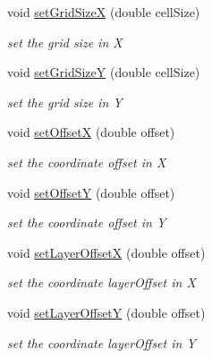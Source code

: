 \begin{DoxyCompactItemize}
void \hyperlink{class_d_d4hep_1_1_d_d_segmentation_1_1_tiled_layer_grid_x_y_a183f76f3765e6ab4985b0d6eb024785a}{setGridSizeX} (double cellSize)
\begin{DoxyCompactList}\small\item\em set the grid size in X \item\end{DoxyCompactList}\item 
void \hyperlink{class_d_d4hep_1_1_d_d_segmentation_1_1_tiled_layer_grid_x_y_a2556a5e0000580a8ffdf93bde33c36b8}{setGridSizeY} (double cellSize)
\begin{DoxyCompactList}\small\item\em set the grid size in Y \item\end{DoxyCompactList}\item 
void \hyperlink{class_d_d4hep_1_1_d_d_segmentation_1_1_tiled_layer_grid_x_y_a19c0059402e512da58c2d241d8e67de7}{setOffsetX} (double offset)
\begin{DoxyCompactList}\small\item\em set the coordinate offset in X \item\end{DoxyCompactList}\item 
void \hyperlink{class_d_d4hep_1_1_d_d_segmentation_1_1_tiled_layer_grid_x_y_a588e04b48f59f73af89b54302e3eb025}{setOffsetY} (double offset)
\begin{DoxyCompactList}\small\item\em set the coordinate offset in Y \item\end{DoxyCompactList}\item 
void \hyperlink{class_d_d4hep_1_1_d_d_segmentation_1_1_tiled_layer_grid_x_y_a4368c4380115aa312e1b127e4b15aed9}{setLayerOffsetX} (double offset)
\begin{DoxyCompactList}\small\item\em set the coordinate layerOffset in X \item\end{DoxyCompactList}\item 
void \hyperlink{class_d_d4hep_1_1_d_d_segmentation_1_1_tiled_layer_grid_x_y_a280670f55a514e9f6f373bef61832ad0}{setLayerOffsetY} (double offset)
\begin{DoxyCompactList}\small\item\em set the coordinate layerOffset in Y \item\end{DoxyCompactList}\item 

\end{DoxyCompactItemize}
